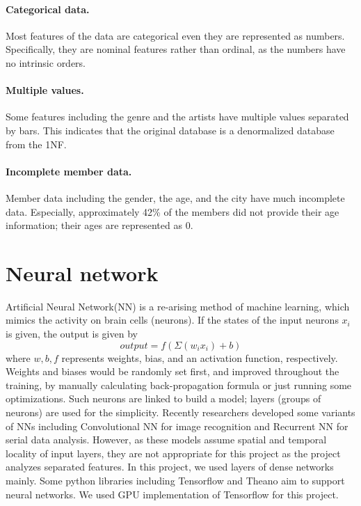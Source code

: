 \documentclass{article}
\begin{document}
\paragraph{Categorical data.}
Most features of the data are categorical even they are represented as
numbers. Specifically, they are nominal features rather than ordinal, as the
numbers have no intrinsic orders.
\paragraph{Multiple values.}
Some features including the genre and the artists have multiple values
separated by bars. This indicates that the original database is
a denormalized database from the 1NF.
\paragraph{Incomplete member data.}
Member data including the gender, the age, and the city have much incomplete
data. Especially, approximately 42\% of the members did not provide their age
information; their ages are represented as 0.

\newpage
\section{Neural network}
Artificial Neural Network(NN) is a re-arising method of machine learning, which
mimics the activity on brain cells (neurons). If the states of the input neurons
$x_i$ is given, the output is given by
\begin{equation*}
output = f \left( \Sigma \left( w_i x_i \right) +b \right)
\end{equation*}
where $w,b,f$ represents weights, bias, and an activation function,
respectively.
Weights and biases would be randomly set first, and improved throughout the training, by manually calculating back-propagation formula or just running some optimizations. Such neurons are linked to build a model; layers (groups of neurons) are used for the simplicity.
Recently researchers developed some variants of NNs including Convolutional NN for image recognition and Recurrent NN for serial data analysis. However, as these models assume spatial and temporal locality of input layers, they are not appropriate for this project as the project analyzes separated features. In this project, we used layers of dense networks mainly.
Some python libraries including Tensorflow and Theano aim to support neural networks. We used GPU implementation of Tensorflow for this project.
\end{document}
